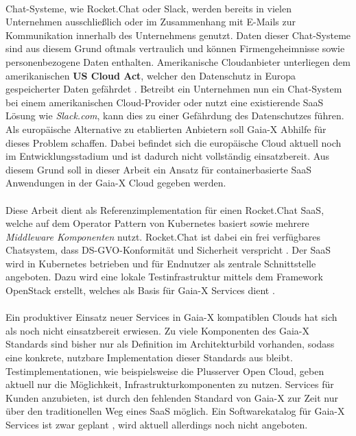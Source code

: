\paragraph{}
Chat-Systeme, wie Rocket.Chat oder Slack, werden bereits in vielen Unternehmen ausschließlich oder im Zusammenhang mit E-Mails
zur Kommunikation innerhalb des Unternehmens genutzt. Daten dieser Chat-Systeme sind aus diesem Grund oftmals vertraulich
und können Firmengeheimnisse sowie personenbezogene Daten enthalten. 
Amerikanische Cloudanbieter unterliegen dem amerikanischen \textbf{US Cloud Act}, welcher
den Datenschutz in Europa gespeicherter Daten gefährdet \cite{Kagermann2021}.
Betreibt ein Unternehmen nun ein Chat-System bei einem amerikanischen Cloud-Provider oder nutzt eine existierende
\ac{SaaS} Lösung wie \emph{Slack.com}, kann dies zu einer Gefährdung des Datenschutzes führen.
Als europäische Alternative zu etablierten Anbietern soll Gaia-X Abhilfe für dieses Problem schaffen.
Dabei befindet sich die europäische Cloud aktuell noch im Entwicklungsstadium und ist dadurch nicht vollständig einsatzbereit.
Aus diesem Grund soll in dieser Arbeit ein Ansatz für containerbasierte \ac{SaaS} Anwendungen in der Gaia-X Cloud gegeben werden.

\paragraph{}
Diese Arbeit dient als Referenzimplementation für einen 
Rocket.Chat \ac{SaaS}, welche auf dem Operator Pattern von Kubernetes basiert sowie mehrere \emph{Middleware Komponenten} nutzt.
Rocket.Chat ist dabei ein frei verfügbares Chatsystem, dass DS-GVO-Konformität und Sicherheit verspricht \cite{RocketChat}.
Der \ac{SaaS} wird in Kubernetes betrieben und für Endnutzer als zentrale Schnittstelle angeboten.
Dazu wird eine lokale Testinfrastruktur mittels dem Framework OpenStack erstellt,
welches als Basis für Gaia-X Services dient \cite{scs}.

\paragraph{}
Ein produktiver Einsatz neuer Services in Gaia-X kompatiblen Clouds hat sich als noch nicht einsatzbereit erwiesen.
Zu viele Komponenten des Gaia-X Standards sind bisher nur als Definition im Architekturbild vorhanden, sodass eine konkrete,
nutzbare Implementation dieser Standards aus bleibt. 
Testimplementationen, wie beispielsweise die Plusserver Open Cloud, geben aktuell nur die Möglichkeit,
Infrastrukturkomponenten zu nutzen.
Services für Kunden anzubieten, ist durch den fehlenden Standard von Gaia-X zur Zeit nur über den traditionellen Weg eines
\ac{SaaS} möglich.
Ein Softwarekatalog für Gaia-X Services ist zwar geplant \cite{BMWi2019},
wird aktuell allerdings noch nicht angeboten.

